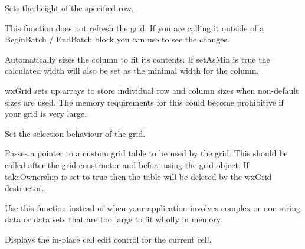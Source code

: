 Sets the height of the specified row. 

This function does not refresh the grid. If you are calling it outside of a BeginBatch / EndBatch
block you can use  to see the changes. 

Automatically sizes the column to fit its contents. If setAsMin is true the calculated width will
also be set as the minimal width for the column.


wxGrid sets up arrays to store individual row and column sizes when non-default sizes are used.
The memory requirements for this could become prohibitive if your grid is very large. 

\label{wxgridsetselectionmode}


Set the selection behaviour of the grid.





\label{wxgridsettable}


Passes a pointer to a custom grid table to be used by the grid. This should be called
after the grid constructor and before using the grid object. If takeOwnership is set to
true then the table will be deleted by the wxGrid destructor. 

Use this function instead of  when your
application involves complex or non-string data or data sets that are too large to fit
wholly in memory. 

\label{wxgridshowcelleditcontrol}


Displays the in-place cell edit control for the current cell.

